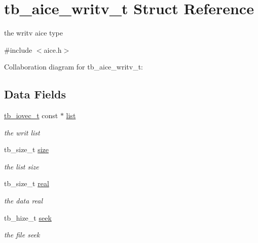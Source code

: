 \hypertarget{structtb__aice__writv__t}{\section{tb\-\_\-aice\-\_\-writv\-\_\-t Struct Reference}
\label{structtb__aice__writv__t}
}


the writv aice type  




{\ttfamily \#include $<$aice.\-h$>$}



Collaboration diagram for tb\-\_\-aice\-\_\-writv\-\_\-t\-:
\subsection*{Data Fields}
\begin{DoxyCompactItemize}
\item 
\hypertarget{structtb__aice__writv__t_a0dae9bb030a45f017896818de0926b10}{\hyperlink{structtb__iovec__t}{tb\-\_\-iovec\-\_\-t} const $\ast$ \hyperlink{structtb__aice__writv__t_a0dae9bb030a45f017896818de0926b10}{list}}\label{structtb__aice__writv__t_a0dae9bb030a45f017896818de0926b10}

\begin{DoxyCompactList}\small\item\em the writ list \end{DoxyCompactList}\item 
\hypertarget{structtb__aice__writv__t_a50a55f1a417268bf2c3c83d24ad1bc84}{tb\-\_\-size\-\_\-t \hyperlink{structtb__aice__writv__t_a50a55f1a417268bf2c3c83d24ad1bc84}{size}}\label{structtb__aice__writv__t_a50a55f1a417268bf2c3c83d24ad1bc84}

\begin{DoxyCompactList}\small\item\em the list size \end{DoxyCompactList}\item 
\hypertarget{structtb__aice__writv__t_a4d1c93d19439a2c2868a9324c0747fe4}{tb\-\_\-size\-\_\-t \hyperlink{structtb__aice__writv__t_a4d1c93d19439a2c2868a9324c0747fe4}{real}}\label{structtb__aice__writv__t_a4d1c93d19439a2c2868a9324c0747fe4}

\begin{DoxyCompactList}\small\item\em the data real \end{DoxyCompactList}\item 
\hypertarget{structtb__aice__writv__t_a85aaa1cabb3576a65d355a1fa5148850}{tb\-\_\-hize\-\_\-t \hyperlink{structtb__aice__writv__t_a85aaa1cabb3576a65d355a1fa5148850}{seek}}\label{structtb__aice__writv__t_a85aaa1cabb3576a65d355a1fa5148850}

\begin{DoxyCompactList}\small\item\em the file seek \end{DoxyCompactList}\end{DoxyCompactItemize}


